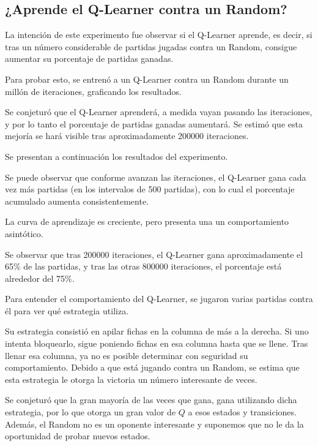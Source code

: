 \subsection{¿Aprende el Q-Learner contra un Random?}

La intención de este experimento fue observar si el Q-Learner aprende, es decir, si tras un número considerable de partidas jugadas contra un Random, consigue aumentar su porcentaje de partidas ganadas.

Para probar esto, se entrenó a un Q-Learner contra un Random durante un millón de iteraciones, graficando los resultados.

Se conjeturó que el Q-Learner aprenderá, a medida vayan pasando las iteraciones, y por lo tanto el porcentaje de partidas ganadas aumentará. Se estimó que esta mejoría se hará visible tras aproximadamente 200000 iteraciones.

Se presentan a continuación los resultados del experimento.



Se puede observar que conforme avanzan las iteraciones, el Q-Learner gana cada vez m\'as partidas (en los intervalos de 500 partidas), con lo cual el porcentaje acumulado aumenta consistentemente.

La curva de aprendizaje es creciente, pero presenta una un comportamiento asintótico.

Se observar que tras 200000 iteraciones, el Q-Learner gana aproximadamente el 65\% de las partidas, y tras las otras 800000 iteraciones, el porcentaje está alrededor del 75\%.

Para entender el comportamiento del Q-Learner, se jugaron varias partidas contra él para ver qué estrategia utiliza.

Su estrategia consistió en apilar fichas en la columna de más a la derecha. Si uno intenta bloquearlo, sigue poniendo fichas en esa columna hasta que se llene. Tras llenar esa columna, ya no es posible determinar con seguridad su comportamiento.
Debido a que está jugando contra un Random, se estima que esta estrategia le otorga la victoria un número interesante de veces.

Se conjeturó que la gran mayoría de las veces que gana, gana utilizando dicha estrategia, por lo que otorga un gran valor de $Q$ a esos estados y transiciones. Además, el Random no es un oponente interesante y suponemos que no le da la oportunidad de probar nuevos estados.

